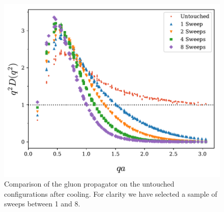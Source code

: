 \begin{figure}[tb]
\centering
\includegraphics[width=\linewidth]{./ScalarGluComp_q2_1to10sweeps.pdf}
\caption{\label{fig:1to10SweepsCooling}Comparison of the gluon propagator on the untouched configurations after cooling. For clarity we have selected a sample of sweeps between 1 and 8.}
\end{figure}
%

